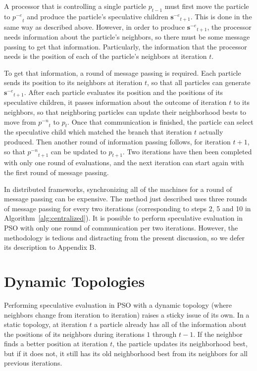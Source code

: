 \documentclass[ms,electronic,twosidetoc,letterpaper,chaptercenter,parttop,equalmargins]{byumsphd}
\newcommand{\alg}[1]{Algorithm~\ref{alg:#1}}
\providecommand{\noeval}[1]{\ensuremath{#1^{-e}}}
\providecommand{\nonbest}[1]{\ensuremath{#1^{-n}}}
\providecommand{\p}{\ensuremath{p}}
\providecommand{\sset}{\ensuremath{\mathbf{s}}}
\begin{document}
A processor that is controlling a single particle $\p_{t-1}$ must first move
the particle to $\noeval{\p}_t$ and produce the particle's speculative children
$\noeval{\sset}_{t+1}$.  This is done in the same way as described above.
However, in order to produce $\noeval{\sset}_{t+1}$, the processor needs
information about the particle's neighbors, so there must be some message
passing to get that information.  Particularly, the information that the
processor needs is the position of each of the particle's neighbors at
iteration $t$.

To get that information, a round of message passing is required.  Each particle
sends its position to its neighbors at iteration $t$, so that all particles can
generate $\noeval{\sset}_{t+1}$.  After each particle evaluates its position
and the positions of its speculative children, it passes information about the
outcome of iteration $t$ to its neighbors, so that neighboring particles can
update their neighborhood bests to move from $\nonbest{\p}_t$ to $\p_t$.  Once
that communication is finished, the particle can select the speculative child
which matched the branch that iteration $t$ actually produced.  Then another
round of information passing follows, for iteration $t+1$, so that
$\nonbest{\p}_{t+1}$ can be updated to $\p_{t+1}$.  Two iterations have then
been completed with only one round of evaluations, and the next iteration can
start again with the first round of message passing.

In distributed frameworks, synchronizing all of the machines for a round of
message passing can be expensive.  The method just described uses three rounds
of message passing for every two iterations (corresponding to steps 2, 5 and 10
in \alg{centralized}).  It is possible to perform speculative evaluation in PSO
with only one round of communication per two iterations.  However, the
methodology is tedious and distracting from the present discussion, so we defer
its description to Appendix B.

\section{Dynamic Topologies}

Performing speculative evaluation in PSO with a dynamic topology (where
neighbors change from iteration to iteration) raises a sticky issue of its own.
In a static topology, at iteration $t$ a particle already has all of the
information about the positions of its neighbors during iterations $1$ through
$t-1$.  If the neighbor finds a better position at iteration $t$, the particle
updates its neighborhood best, but if it does not, it still has its old
neighborhood best from its neighbors for all previous iterations.
\end{document}
